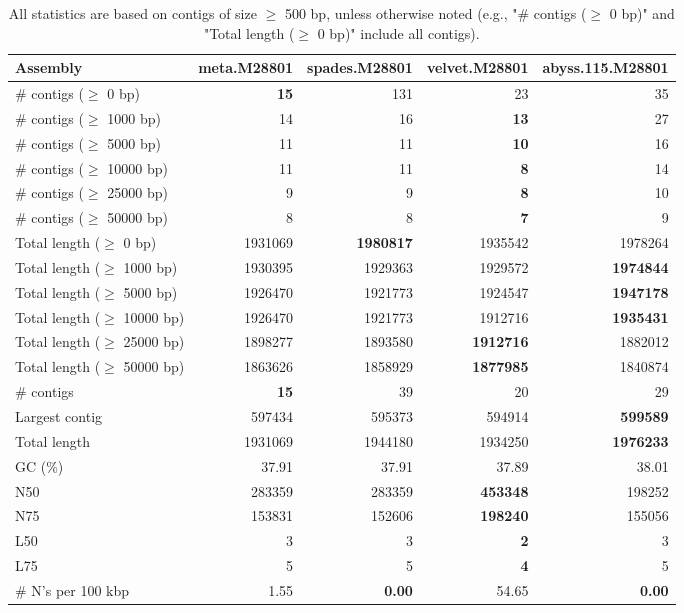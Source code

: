 \documentclass[12pt,a4paper]{article}
\begin{document}
\begin{table}[ht]
\begin{center}
\caption{All statistics are based on contigs of size $\geq$ 500 bp, unless otherwise noted (e.g., "\# contigs ($\geq$ 0 bp)" and "Total length ($\geq$ 0 bp)" include all contigs).}
\begin{tabular}{|l*{4}{|r}|}
\hline
Assembly & meta.M28801 & spades.M28801 & velvet.M28801 & abyss.115.M28801 \\ \hline
\# contigs ($\geq$ 0 bp) & {\bf 15} & 131 & 23 & 35 \\ \hline
\# contigs ($\geq$ 1000 bp) & 14 & 16 & {\bf 13} & 27 \\ \hline
\# contigs ($\geq$ 5000 bp) & 11 & 11 & {\bf 10} & 16 \\ \hline
\# contigs ($\geq$ 10000 bp) & 11 & 11 & {\bf 8} & 14 \\ \hline
\# contigs ($\geq$ 25000 bp) & 9 & 9 & {\bf 8} & 10 \\ \hline
\# contigs ($\geq$ 50000 bp) & 8 & 8 & {\bf 7} & 9 \\ \hline
Total length ($\geq$ 0 bp) & 1931069 & {\bf 1980817} & 1935542 & 1978264 \\ \hline
Total length ($\geq$ 1000 bp) & 1930395 & 1929363 & 1929572 & {\bf 1974844} \\ \hline
Total length ($\geq$ 5000 bp) & 1926470 & 1921773 & 1924547 & {\bf 1947178} \\ \hline
Total length ($\geq$ 10000 bp) & 1926470 & 1921773 & 1912716 & {\bf 1935431} \\ \hline
Total length ($\geq$ 25000 bp) & 1898277 & 1893580 & {\bf 1912716} & 1882012 \\ \hline
Total length ($\geq$ 50000 bp) & 1863626 & 1858929 & {\bf 1877985} & 1840874 \\ \hline
\# contigs & {\bf 15} & 39 & 20 & 29 \\ \hline
Largest contig & 597434 & 595373 & 594914 & {\bf 599589} \\ \hline
Total length & 1931069 & 1944180 & 1934250 & {\bf 1976233} \\ \hline
GC (\%) & 37.91 & 37.91 & 37.89 & 38.01 \\ \hline
N50 & 283359 & 283359 & {\bf 453348} & 198252 \\ \hline
N75 & 153831 & 152606 & {\bf 198240} & 155056 \\ \hline
L50 & 3 & 3 & {\bf 2} & 3 \\ \hline
L75 & 5 & 5 & {\bf 4} & 5 \\ \hline
\# N's per 100 kbp & 1.55 & {\bf 0.00} & 54.65 & {\bf 0.00} \\ \hline
\end{tabular}
\end{center}
\end{table}
\end{document}
